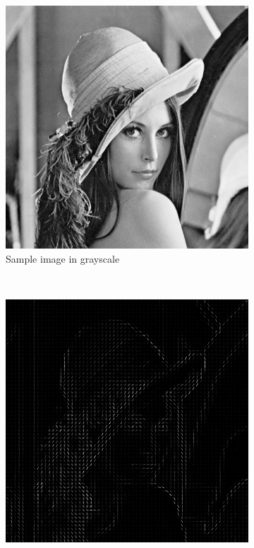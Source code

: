 \begin{figure}[h]
    \begin{subfigure}[t]{0.3\textwidth}
        \includegraphics[width=\textwidth]{images/lena}
        \caption{Sample image in grayscale}
        \label{fig:lena_hog:lena}
    \end{subfigure}
    ~
    \begin{subfigure}[t]{0.3\textwidth}
        \includegraphics[width=\textwidth]{images/lena_hog_8x8}

\end{subfigure}
\end{figure}
